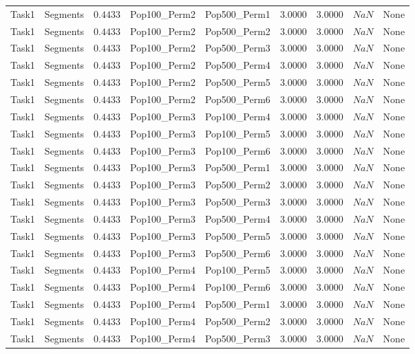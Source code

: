 \documentclass[8pt]{article}
\begin{document}
\begin{longtable}{llccccccc}
Task1 & Segments & $0.4433$ & Pop100\_Perm2 & Pop500\_Perm1 & 3.0000 & 3.0000 & $NaN$ & None \\
Task1 & Segments & $0.4433$ & Pop100\_Perm2 & Pop500\_Perm2 & 3.0000 & 3.0000 & $NaN$ & None \\
Task1 & Segments & $0.4433$ & Pop100\_Perm2 & Pop500\_Perm3 & 3.0000 & 3.0000 & $NaN$ & None \\
Task1 & Segments & $0.4433$ & Pop100\_Perm2 & Pop500\_Perm4 & 3.0000 & 3.0000 & $NaN$ & None \\
Task1 & Segments & $0.4433$ & Pop100\_Perm2 & Pop500\_Perm5 & 3.0000 & 3.0000 & $NaN$ & None \\
Task1 & Segments & $0.4433$ & Pop100\_Perm2 & Pop500\_Perm6 & 3.0000 & 3.0000 & $NaN$ & None \\
Task1 & Segments & $0.4433$ & Pop100\_Perm3 & Pop100\_Perm4 & 3.0000 & 3.0000 & $NaN$ & None \\
Task1 & Segments & $0.4433$ & Pop100\_Perm3 & Pop100\_Perm5 & 3.0000 & 3.0000 & $NaN$ & None \\
Task1 & Segments & $0.4433$ & Pop100\_Perm3 & Pop100\_Perm6 & 3.0000 & 3.0000 & $NaN$ & None \\
Task1 & Segments & $0.4433$ & Pop100\_Perm3 & Pop500\_Perm1 & 3.0000 & 3.0000 & $NaN$ & None \\
Task1 & Segments & $0.4433$ & Pop100\_Perm3 & Pop500\_Perm2 & 3.0000 & 3.0000 & $NaN$ & None \\
Task1 & Segments & $0.4433$ & Pop100\_Perm3 & Pop500\_Perm3 & 3.0000 & 3.0000 & $NaN$ & None \\
Task1 & Segments & $0.4433$ & Pop100\_Perm3 & Pop500\_Perm4 & 3.0000 & 3.0000 & $NaN$ & None \\
Task1 & Segments & $0.4433$ & Pop100\_Perm3 & Pop500\_Perm5 & 3.0000 & 3.0000 & $NaN$ & None \\
Task1 & Segments & $0.4433$ & Pop100\_Perm3 & Pop500\_Perm6 & 3.0000 & 3.0000 & $NaN$ & None \\
Task1 & Segments & $0.4433$ & Pop100\_Perm4 & Pop100\_Perm5 & 3.0000 & 3.0000 & $NaN$ & None \\
Task1 & Segments & $0.4433$ & Pop100\_Perm4 & Pop100\_Perm6 & 3.0000 & 3.0000 & $NaN$ & None \\
Task1 & Segments & $0.4433$ & Pop100\_Perm4 & Pop500\_Perm1 & 3.0000 & 3.0000 & $NaN$ & None \\
Task1 & Segments & $0.4433$ & Pop100\_Perm4 & Pop500\_Perm2 & 3.0000 & 3.0000 & $NaN$ & None \\
Task1 & Segments & $0.4433$ & Pop100\_Perm4 & Pop500\_Perm3 & 3.0000 & 3.0000 & $NaN$ & None \\

\end{longtable}
\end{document}

